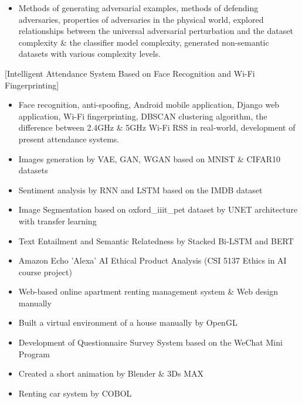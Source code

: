 \documentclass{article}
\begin{document}
\begin{itemize}
    \item Methods of generating adversarial examples, methods of defending adversaries, properties of adversaries in the physical world, explored relationships between the universal adversarial perturbation and the dataset complexity & the classifier model complexity, generated non-semantic datasets with various complexity levels. 
\end{itemize}

[Intelligent Attendance System Based on Face Recognition and Wi-Fi Fingerprinting]

\begin{itemize}
    \item Face recognition, anti-spoofing, Android mobile application, Django web application, Wi-Fi fingerprinting, DBSCAN clustering algorithm, the difference between 2.4GHz & 5GHz Wi-Fi RSS in real-world, development of present attendance systems.
\end{itemize}


\begin{itemize}
    \item Images generation by VAE, GAN, WGAN based on MNIST \& CIFAR10 datasets
    \item Sentiment analysis by RNN and LSTM based on the IMDB dataset 
    \item Image Segmentation based on oxford\_iiit\_pet dataset by UNET architecture with transfer learning
    \item Text Entailment and Semantic Relatedness by Stacked Bi-LSTM and BERT
    \item Amazon Echo 'Alexa' AI Ethical Product Analysis (CSI 5137 Ethics in AI course project)
    \item Web-based online apartment renting management system & Web design manually
    \item Built a virtual environment of a house manually by OpenGL
    \item Development of Questionnaire Survey System based on the WeChat Mini Program
    \item Created a short animation by Blender \& 3Ds MAX
    \item Renting car system by COBOL
\end{itemize}
\end{document}
